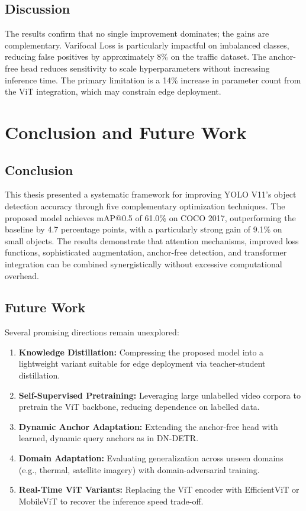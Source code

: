 \documentclass[12pt, a4paper]{report}
\begin{document}
\section{Discussion}

The results confirm that no single improvement dominates; the gains are 
complementary. Varifocal Loss is particularly impactful on imbalanced classes, 
reducing false positives by approximately 8\% on the traffic dataset. The 
anchor-free head reduces sensitivity to scale hyperparameters without 
increasing inference time. The primary limitation is a 14\% increase in 
parameter count from the ViT integration, which may constrain edge deployment.

\chapter{Conclusion and Future Work}
\label{chap:conclusion}

\section{Conclusion}

This thesis presented a systematic framework for improving YOLO V11's object 
detection accuracy through five complementary optimization techniques. The 
proposed model achieves mAP@0.5 of 61.0\% on COCO 2017, outperforming the 
baseline by 4.7 percentage points, with a particularly strong gain of 9.1\% 
on small objects. The results demonstrate that attention mechanisms, improved 
loss functions, sophisticated augmentation, anchor-free detection, and 
transformer integration can be combined synergistically without excessive 
computational overhead.

\section{Future Work}

Several promising directions remain unexplored:

\begin{enumerate}
  \item \textbf{Knowledge Distillation:} Compressing the proposed model 
    into a lightweight variant suitable for edge deployment via teacher-student distillation.
  \item \textbf{Self-Supervised Pretraining:} Leveraging large unlabelled 
    video corpora to pretrain the ViT backbone, reducing dependence on 
    labelled data.
  \item \textbf{Dynamic Anchor Adaptation:} Extending the anchor-free 
    head with learned, dynamic query anchors as in DN-DETR.
  \item \textbf{Domain Adaptation:} Evaluating generalization across 
    unseen domains (e.g., thermal, satellite imagery) with domain-adversarial training.
  \item \textbf{Real-Time ViT Variants:} Replacing the ViT encoder with 
    EfficientViT or MobileViT to recover the inference speed trade-off.
\end{enumerate}



\end{document}
